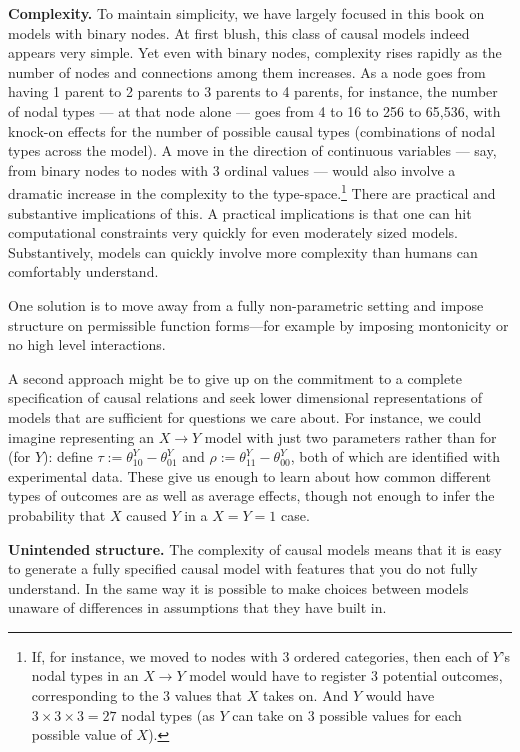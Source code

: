 \documentclass[
  12pt,
]{book}
\begin{document}
\textbf{Complexity.} To maintain simplicity, we have largely focused in this book on models with binary nodes. At first blush, this class of causal models indeed appears very simple. Yet even with binary nodes, complexity rises rapidly as the number of nodes and connections among them increases. As a node goes from having 1 parent to 2 parents to 3 parents to 4 parents, for instance, the number of nodal types --- at that node alone --- goes from 4 to 16 to 256 to 65,536, with knock-on effects for the number of possible causal types (combinations of nodal types across the model). A move in the direction of continuous variables --- say, from binary nodes to nodes with 3 ordinal values --- would also involve a dramatic increase in the complexity to the type-space.\footnote{If, for instance, we moved to nodes with 3 ordered categories, then each of \(Y\)'s nodal types in an \(X \rightarrow Y\) model would have to register 3 potential outcomes, corresponding to the 3 values that \(X\) takes on. And \(Y\) would have \(3 \times 3 \times 3 = 27\) nodal types (as \(Y\) can take on 3 possible values for each possible value of \(X\)).} There are practical and substantive implications of this. A practical implications is that one can hit computational constraints very quickly for even moderately sized models. Substantively, models can quickly involve more complexity than humans can comfortably understand.

One solution is to move away from a fully non-parametric setting and impose structure on permissible function forms---for example by imposing montonicity or no high level interactions.

A second approach might be to give up on the commitment to a complete specification of causal relations and seek lower dimensional representations of models that are sufficient for questions we care about. For instance, we could imagine representing an \(X \rightarrow Y\) model with just two parameters rather than for (for \(Y\)): define \(\tau := \theta^Y_{10}-\theta^Y_{01}\) and \(\rho := \theta^Y_{11}-\theta^Y_{00}\), both of which are identified with experimental data. These give us enough to learn about how common different types of outcomes are as well as average effects, though not enough to infer the probability that \(X\) caused \(Y\) in a \(X=Y=1\) case.

\textbf{Unintended structure.} The complexity of causal models means that it is easy to generate a fully specified causal model with features that you do not fully understand. In the same way it is possible to make choices between models unaware of differences in assumptions that they have built in.
\end{document}
